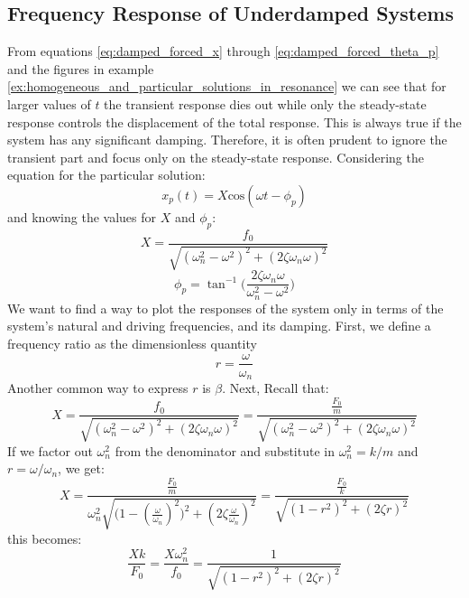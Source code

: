 \documentclass[12pt,letter]{article}
\begin{document}
\subsection{Frequency Response of Underdamped Systems}						
	From equations \ref{eq:damped_forced_x} through \ref{eq:damped_forced_theta_p} and the figures in example \ref{ex:homogeneous_and_particular_solutions_in_resonance} we can see that for larger values of $t$ the transient response dies out while only the steady-state response controls the displacement of the total response. This is always true if the system has any significant damping. Therefore, it is often prudent to ignore the transient part and focus only on the steady-state response. Considering the equation for the particular solution: 
	\begin{equation}
		x_p(t) = X \text{cos}(\omega t - \phi_p)
	\end{equation}			 
	and knowing the values for $X$ and $\phi_p$: 
	\begin{equation}
		X = \frac{f_0}{\sqrt{(\omega_n^2 - \omega^2)^2 +  (2\zeta \omega_n \omega)^2}} 
	\end{equation}	
	\begin{equation}
		\phi_p = \tan^{-1} \bigg(\frac{2\zeta \omega_n \omega}{\omega_n^2 - \omega^2}\bigg)
	\end{equation}	
	We want to find a way to plot the responses of the system only in terms of the system's natural and driving frequencies, and its damping. First, we define a frequency ratio as the dimensionless quantity 
	\begin{equation}
		r = \frac{\omega}{\omega_n}
	\end{equation}
	Another common way to express $r$ is $\beta$. Next, Recall that:
	\begin{equation}
		X = \frac{f_0}{\sqrt{(\omega_n^2 - \omega^2)^2 +  (2\zeta \omega_n \omega)^2}}  = \frac{\frac{F_0}{m}}{\sqrt{(\omega_n^2 - \omega^2)^2 +  (2\zeta \omega_n \omega)^2}} 
	\end{equation}				
	If we factor out $\omega_n^2$ from the denominator and substitute in $\omega_n^2 = k/m$ and $r = \omega/\omega_n$, we get:
	\begin{equation}
		X = \frac{\frac{F_0}{m}}{\omega_n^2 \sqrt{\big(1 - (\frac{\omega}{\omega_n})^2\big)^2 +  (2\zeta \frac{\omega}{\omega_n})^2}} =  \frac{\frac{F_0}{k}}{\sqrt{(1-r^2)^2+(2\zeta r)^2}}
	\end{equation}				
	this becomes:
	\begin{equation}
		\frac{Xk}{F_0} = \frac{X \omega_n^2}{f_0} = \frac{1}{\sqrt{(1-r^2)^2+(2\zeta r)^2}}
	\end{equation}				
\end{document}
